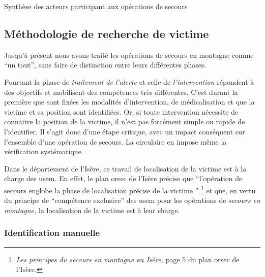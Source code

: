 \begin{table}
  \centering
  
  \caption{Synthèse des acteurs participant aux opérations de secours}
  \label{tbl:org_sec}
\end{table}



\subsection{Méthodologie de recherche de victime}
\label{susec:1-1-2}

Jusqu'à présent nous avons traité les opérations de secours en
montagne comme \enquote{un tout}, sans faire de distinction entre
leurs différentes phases.

%
Pourtant la phase de \emph{traitement de l'alerte} et celle de
\emph{l'intervention} répondent à des objectifs et mobilisent des
compétences très différentes. C'est durant la première que sont fixées
les modalités d'intervention, de médicalisation et que la victime et
sa position sont identifiées. Or, si toute intervention nécessite de
connaitre la position de la victime, il n'est pas forcément simple ou
rapide de l'identifier. Il s'agit donc d'une étape critique, avec un
impact conséquent sur l'ensemble d'une opération de secours.
%
La circulaire  en impose même la vérification systématique.



Dans le département de l'Isère, ce travail de localisation de la
victime est à la charge des \ac{usem}. En effet, le plan \ac{orsec} de
l'Isère précise que \enquote{l’opération de secours \textelp{} englobe
  la phase de localisation précise de la victime \textelp{}}
\footnote{\emph{Les principes du secours en montagne en Isère,} page 5
  du plan \ac{orsec} de l'Isère.} et que, en vertu du principe de
\enquote{compétence exclusive} des \ac{usem} pour les opérations de
\emph{secours en montagne,} la localisation de la victime est à leur
charge.


\subsubsection{Identification manuelle}
\label{subsec:1-1-2-1}

